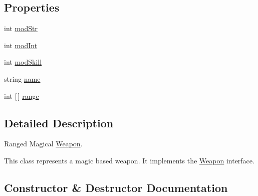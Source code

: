 \subsection*{Properties}
\begin{DoxyCompactItemize}
\item 
int \hyperlink{class_model_1_1_weapon_module_1_1_fireball_a45f4f283e66024801ec7b96d4b743113}{mod\+Str}
\item 
int \hyperlink{class_model_1_1_weapon_module_1_1_fireball_a6c217e1fc8978051c53270ae8fcb545a}{mod\+Int}
\item 
int \hyperlink{class_model_1_1_weapon_module_1_1_fireball_a98cfe83a5eb848beb4565cebfe45e936}{mod\+Skill}
\item 
string \hyperlink{class_model_1_1_weapon_module_1_1_fireball_a9369ddc01ad4ef337914b316d5940283}{name}
\item 
int \mbox{[}$\,$\mbox{]} \hyperlink{class_model_1_1_weapon_module_1_1_fireball_aaf028421e893ade01e5283bb4f74be0b}{range}
\end{DoxyCompactItemize}


\subsection{Detailed Description}
Ranged Magical \hyperlink{interface_model_1_1_weapon_module_1_1_weapon}{Weapon}. 

This class represents a magic based weapon. It implements the \hyperlink{interface_model_1_1_weapon_module_1_1_weapon}{Weapon} interface. 

\subsection{Constructor \& Destructor Documentation}
\hypertarget{class_model_1_1_weapon_module_1_1_fireball_a60594308438b38900bebbab15f2e62a4}{}\label{class_model_1_1_weapon_module_1_1_fireball_a60594308438b38900bebbab15f2e62a4} 
